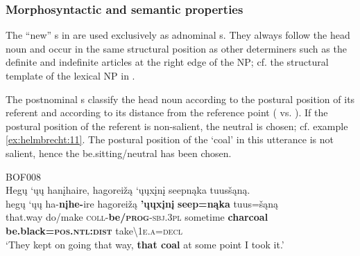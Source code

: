 \documentclass[output=paper]{langsci/langscibook}
\begin{document}
\subsubsection{Morphosyntactic and semantic properties}\label{sec:helmbrecht:3.1.1}

The ``new'' s in  are used exclusively as adnominal s. They always follow the head noun and occur in the same structural position as other determiners such as the definite and indefinite articles at the right edge of the NP; cf. the structural template of the lexical NP in .

\begin{table}
\caption{Structure of the NP in Hoocąk. Elements in parentheses are optional.}
\label{tab:helmbrecht:12}
\end{table} 

The postnominal s classify the head noun according to the postural position of its referent and according to its distance from the reference point ( vs. ). If the postural position of the referent is non-salient, the neutral  is chosen; cf. example \ref{ex:helmbrecht:11}. The postural position of the `coal' in this utterance is not salient, hence the be.sitting\slash neutral  has been chosen.

\ea \label{ex:helmbrecht:11}
BOF008\\
\glll Hegų `ųų hanįhaire, hagoreižą `ųųxįnį seepnąka tuusšąną.\\
    hegų        `ųų          ha-\textbf{nįhe-}ire          hagoreižą   \textbf{'ųųxįnį}   \textbf{seep=nąka}                     tuus=šąną\\
    that.way  do/make \textsc{coll}-\textbf{be/}\textbf{\textsc{prog}}-\textsc{sbj}.\textsc{3pl}  sometime    \textbf{charcoal} \textbf{be.black=}\textbf{\textsc{pos.ntl}:\textsc{dist}}   take{\textbackslash}\textsc{1e.a}=\textsc{decl}\\
\glt  `They kept on going that way, \textbf{that coal} at some point I took it.'
\z
\end{document}
